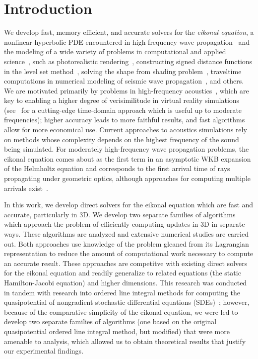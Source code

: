 \documentclass[eikonal.tex]{subfiles}
\begin{document}
\section{Introduction}\label{sec:introduction}

We develop fast, memory efficient, and accurate solvers for the
\emph{eikonal equation}, a nonlinear hyperbolic PDE encountered in
high-frequency wave propagation~\cite{engquist2003computational} and
the modeling of a wide variety of problems in computational and
applied science~\cite{sethian1999level}, such as photorealistic
rendering~\cite{ihrke2007eikonal}, constructing signed distance
functions in the level set method~\cite{osher2006level}, solving the
shape from shading
problem~\cite{kimmel2001optimal,prados2006shape,durou2008numerical},
traveltime computations in numerical modeling of seismic wave
propagation~\cite{sethian19993,popovici20023,kim20023,van1991upwind,vidale1990finite},
and others. We are motivated primarily by problems in high-frequency
acoustics~\cite{prislan2016ray}, which are key to enabling a higher
degree of verisimilitude in virtual reality simulations
(see~\cite{raghuvanshi2014parametric,raghuvanshi2018parametric} for a
cutting-edge time-domain approach which is useful up to moderate
frequencies); higher accuracy leads to more faithful results, and fast
algorithms allow for more economical use. Current approaches to
acoustics simulations rely on methods whose complexity depends on the
highest frequency of the sound being simulated. For moderately
high-frequency wave propagation problems, the eikonal equation comes
about as the first term in an asymptotic WKB expansion of the
Helmholtz equation and corresponds to the first arrival time of rays
propagating under geometric optics, although approaches for computing
multiple arrivals exist~\cite{fomel2002fast}.

In this work, we develop direct solvers for the eikonal equation which
are fast and accurate, particularly in 3D. We develop two separate
families of algorithms which approach the problem of efficiently
computing updates in 3D in separate ways. These algorithms are
analyzed and extensive numerical studies are carried out. Both
approaches use knowledge of the problem gleaned from its Lagrangian
representation to reduce the amount of computational work necessary to
compute an accurate result. These approaches are competitve with
existing direct solvers for the eikonal equation and readily
generalize to related equations (the static Hamilton-Jacobi equation)
and higher dimensions. This research was conducted in tandem with
research into ordered line integral methods for computing the
quasipotential of nongradient stochastic differential equations
(SDEs)~\cite{dahiya2017ordered,dahiya2018ordered,yang2019computing};
however, because of the comparative simplicity of the eikonal
equation, we were led to develop two separate families of algorithms
(one based on the original quasipotential ordered line integral
method, but modified) that were more amenable to analysis, which
allowed us to obtain theoretical results that justify our experimental
findings.
\end{document}

